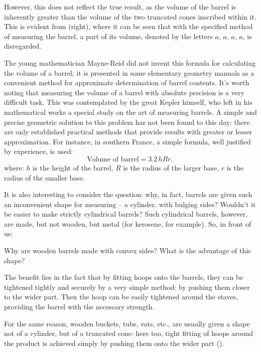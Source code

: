 However, this does not reflect the true result, as the volume of the barrel is inherently greater than the volume of the two truncated cones inscribed within it. This is evident from  (right), where it can be seen that with the specified method of measuring the barrel, a part of its volume, denoted by the letters $a$, $a$, $a$, $a$, is disregarded.


The young mathematician Mayne-Reid did not invent this formula for calculating the volume of a barrel; it is presented in some elementary geometry manuals as a convenient method for approximate determination of barrel contents. It's worth noting that measuring the volume of a barrel with absolute precision is a very difficult task. This was contemplated by the great Kepler himself, who left in his mathematical works a special study on the art of measuring barrels. A simple and precise geometric solution to this problem has not been found to this day: there are only established practical methods that provide results with greater or lesser approximation. For instance, in southern France, a simple formula, well justified by experience, is used:
\begin{equation*}%
\text{Volume of barrel} = 3.2\, hRr, 
\end{equation*}
where: $h$ is the height of the barrel, $R$ is the radius of the larger base, $r$ is the radius of the smaller base.

It is also interesting to consider the question: why, in fact, barrels are given such an inconvenient shape for measuring -- a cylinder. with bulging sides? Wouldn't it be easier to make strictly cylindrical barrels? Such cylindrical barrels, however, are made, but not wooden, but metal (for kerosene, for example). So, in front of us:

\ques Why are wooden barrels made with convex sides? What is the advantage of this shape?

\ans The benefit lies in the fact that by fitting hoops onto the barrels, they can be tightened tightly and securely by a very simple method: by pushing them closer to the wider part. Then the hoop can be easily tightened around the staves, providing the barrel with the necessary strength.

For the same reason, wooden buckets, tubs, vats, etc., are usually given a shape not of a cylinder, but of a truncated cone: here too, tight fitting of hoops around the product is achieved simply by pushing them onto the wider part ().

